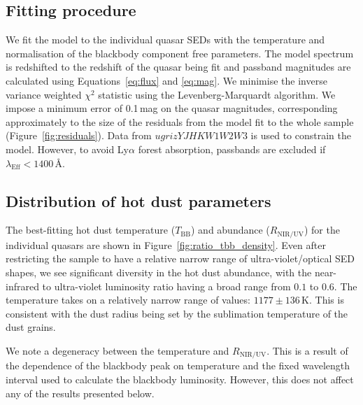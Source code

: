 \subsection{Fitting procedure}

We fit the model to the individual quasar SEDs with the temperature and normalisation of the blackbody component free parameters. 
The model spectrum is redshifted to the redshift of the quasar being fit and passband magnitudes are calculated using Equations~\ref{eq:flux} and \ref{eq:mag}.   
We minimise the inverse variance weighted $\chi^2$ statistic using the Levenberg-Marquardt algorithm. 
We impose a minimum error of 0.1\,mag on the quasar magnitudes, corresponding approximately to the size of the residuals from the model fit to the whole sample (Figure~\ref{fig:residuals}). 
Data from $ugrizYJHKW1W2W3$ is used to constrain the model. 
However, to avoid Ly$\alpha$ forest absorption, passbands are excluded if $\lambda_{\text{Eff}} < 1400$\,\AA.   

\subsection{Distribution of hot dust parameters}

The best-fitting hot dust temperature ($T_{\text{BB}}$) and abundance ($R_{\text{NIR/UV}}$) for the individual quasars are shown in Figure~\ref{fig:ratio_tbb_density}.
Even after restricting the sample to have a relative narrow range of ultra-violet/optical SED shapes, we see significant diversity in the hot dust abundance, with the near-infrared to ultra-violet luminosity ratio having a broad range from $0.1$ to $0.6$.
The temperature takes on a relatively narrow range of values: $1177\pm136$\,K. 
This is consistent with the dust radius being set by the sublimation temperature of the dust grains. 

We note a degeneracy between the temperature and $R_{\text{NIR/UV}}$. 
This is a result of the dependence of the blackbody peak on temperature and the fixed wavelength interval used to calculate the blackbody luminosity. 
However, this does not affect any of the results presented below. 

